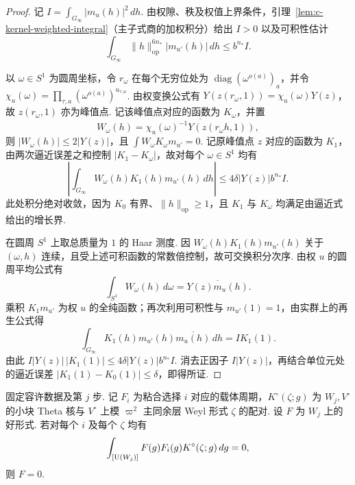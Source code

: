 \begin{proof}
记 $I=\int_{G_\infty}|m_u(h)|^2\,dh$. 由权隙、秩及权值上界条件，引理~\ref{lem:c-kernel-weighted-integral}（主子式商的加权积分）给出 $I>0$ 以及可积性估计
\[
 \int_{G_\infty}\|h\|_{\mathrm{op}}^{6n_*}|m_{u'}(h)|\,dh
 \le b^{n_*} I .
\]

以 $\omega\in S^1$ 为圆周坐标，令 $r_\omega$ 在每个无穷位处为 $\operatorname{diag}(\omega^{o(a)})_a$，并令 $\chi_u(\omega)=\prod_{\tau,a}(\omega^{o(a)})^{u_{\tau,a}}$. 由权变换公式有 $Y(z(r_\omega,1))=\chi_u(\omega)Y(z)$，故 $z(r_\omega,1)$ 亦为峰值点. 记该峰值点对应的函数为 $K_\omega$，并置
\[
 W_\omega(h)=\overline{\chi_u(\omega)^{-1}Y(z(r_\omega h,1))},
\]
则 $|W_\omega(h)|\le2|Y(z)|$，且 $\int W_\omega K_\omega m_{u'}=0$. 记原峰值点 $z$ 对应的函数为 $K_1$，由两次逼近误差之和控制 $|K_1-K_\omega|$，故对每个 $\omega\in S^1$ 均有
\[
 \left|\int_{G_\infty}W_\omega(h)K_1(h)m_{u'}(h)\,dh\right|
 \le 4\delta |Y(z)|b^{n_*}I .
\]
此处积分绝对收敛，因为 $K_0$ 有界、$\|h\|_{\mathrm{op}}\ge1$，且 $K_1$ 与 $K_\omega$ 均满足由逼近式给出的增长界.

在圆周 $S^1$ 上取总质量为 $1$ 的 Haar 测度. 因 $W_\omega(h)K_1(h)m_{u'}(h)$ 关于 $(\omega,h)$ 连续，且受上述可积函数的常数倍控制，故可交换积分次序. 由权 $u$ 的圆周平均公式有
\[
 \int_{S^1}W_\omega(h)\,d\omega=\overline{Y(z)m_u(h)} .
\]
乘积 $K_1m_{u'}$ 为权 $u$ 的全纯函数；再次利用可积性与 $m_{u'}(1)=1$，由实群上的再生公式得
\[
 \int_{G_\infty}K_1(h)m_{u'}(h)\overline{m_u(h)}\,dh=I K_1(1).
\]
由此 $I|Y(z)|\,|K_1(1)|\le4\delta|Y(z)|b^{n_*}I$. 消去正因子 $I|Y(z)|$，再结合单位元处的逼近误差 $|K_1(1)-K_0(1)|\le\delta$，即得所证.
\end{proof}

\begin{lemma}
\label{lem:c-kernel-separation}
\emitthmsource
固定容许数据及第 $j$ 步. 记 $F_i$ 为粘合选择 $i$ 对应的载体周期，$K^\circ(\zeta;g)$ 为 $W_j,V^\circ$ 的小块 Theta 核与 $V^\circ$ 上模 $\varpi^2$ 主同余层 Weyl 形式 $\zeta$ 的配对. 设 $F$ 为 $W_j$ 上的好形式. 若对每个 $i$ 及每个 $\zeta$ 均有
\[
 \int_{[\operatorname{U}(W_j)]}F(g)F_i(g)K^\circ(\zeta;g)\,dg=0,
\]
则 $F=0$.
\end{lemma}

